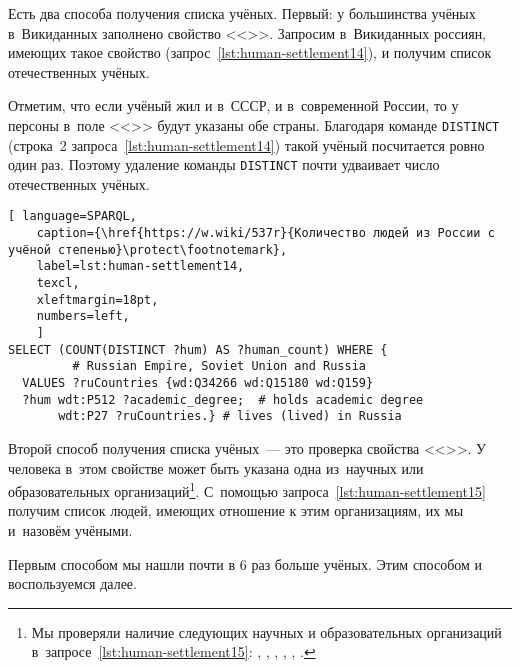 Есть два способа получения списка учёных. 
Первый: у большинства учёных в~Викиданных заполнено свойство <<>>. 
Запросим в~Викиданных россиян, имеющих такое свойство (запрос~\ref{lst:human-settlement14}), 
и получим список отечественных учёных. 


Отметим, что если учёный жил и в~СССР, и в~современной России, 
то у персоны в~поле <<>> будут указаны обе страны.  
Благодаря команде \lstinline|DISTINCT| (строка~2 запроса~\ref{lst:human-settlement14}) 
такой учёный посчитается ровно один раз. 
Поэтому удаление команды \lstinline|DISTINCT| почти удваивает число отечественных учёных. 

\begin{lstlisting}[ language=SPARQL, 
    caption={\href{https://w.wiki/537r}{Количество людей из России с учёной степенью}\protect\footnotemark},
    label=lst:human-settlement14,
    texcl, 
    xleftmargin=18pt, 
    numbers=left,
    ]
SELECT (COUNT(DISTINCT ?hum) AS ?human_count) WHERE {
         # Russian Empire, Soviet Union and Russia
  VALUES ?ruCountries {wd:Q34266 wd:Q15180 wd:Q159}
  ?hum wdt:P512 ?academic_degree;  # holds academic degree 
       wdt:P27 ?ruCountries.} # lives (lived) in Russia
\end{lstlisting}%

Второй способ получения списка учёных~--- это проверка свойства 
<<>>. 
У человека в~этом свойстве может быть указана одна из~научных или образовательных организаций\footnote{%
%
%
Мы проверяли наличие следующих научных и образовательных организаций
в~запросе~\ref{lst:human-settlement15}: 
, , 
, , 
, .%
}.  %
С~помощью запроса~\ref{lst:human-settlement15} 
получим список людей, имеющих отношение к этим организациям, 
их мы и~назовём учёными. 

Первым способом мы нашли почти в 6 раз больше учёных. 
Этим способом и воспользуемся далее. 

